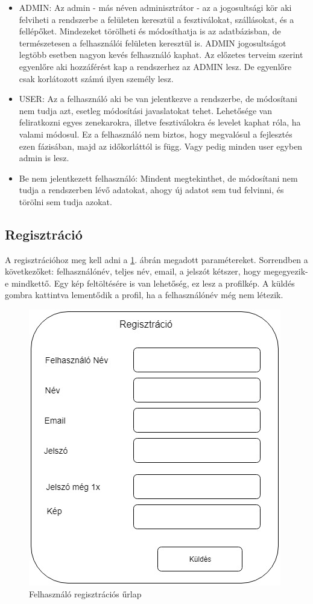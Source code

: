 \begin{itemize}
\item ADMIN: Az admin - más néven adminisztrátor - az a jogosultsági kör aki felviheti a rendszerbe a felületen keresztül a fesztiválokat, szállásokat, és a fellépőket. Mindezeket törölheti és módosíthatja is az adatbázisban, de természetesen a felhasználói felületen keresztül is. ADMIN jogosultságot legtöbb esetben nagyon kevés felhasználó kaphat. Az előzetes terveim szerint egyenlőre aki hozzáférést kap a rendszerhez az ADMIN lesz. De egyenlőre csak korlátozott számú ilyen személy lesz.
\item USER: Az a felhasználó aki be van jelentkezve a rendszerbe, de módosítani nem tudja azt, esetleg módosítási javaslatokat tehet. Lehetősége van feliratkozni egyes zenekarokra, illetve fesztiválokra és levelet kaphat róla, ha valami módosul. Ez a felhasználó nem biztos, hogy megvalósul a fejlesztés ezen fázisában, majd az időkorláttól is függ. Vagy pedig minden user egyben admin is lesz.
\item Be nem jelentkezett felhasználó: Mindent megtekinthet, de módosítani nem tudja a rendszerben lévő adatokat, ahogy új adatot sem tud felvinni, és törölni sem tudja azokat.
\end{itemize}

\subsection{Regisztráció}

A regisztrációhoz meg kell adni a \ref{fig:registration}. ábrán megadott paramétereket. Sorrendben a következőket: felhasználónév, teljes név, email, a jelszót kétszer, hogy megegyezik-e mindkettő. Egy kép feltöltésére is van lehetőség, ez lesz a profilkép. A küldés gombra kattintva lementődik a profil, ha a felhasználónév még nem létezik.

\begin{figure}
\centering
\includegraphics[scale=0.5]{kepek/registration.jpg}
\caption{Felhasználó regisztrációs űrlap}
\label{fig:registration}
\end{figure}

